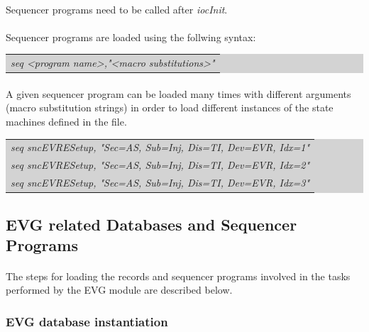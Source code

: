 \documentclass[openany]{article}
\begin{document}
		\paragraph{} {\color{red}Sequencer programs need to be called after \emph{iocInit}.}

		\paragraph{} Sequencer programs are loaded using the follwing syntax:

		\bigskip
		\colorbox{lightgray}{
			\begin{tabularx}{0.9\textwidth}{X}
			\emph{seq \textless program name\textgreater,"\textless macro substitutions\textgreater"}
			\end{tabularx}
		}

		\paragraph{} A given sequencer program can be loaded many times with different arguments (macro substitution strings) in order to load different instances of the state machines defined in the file.

		\bigskip
		\colorbox{lightgray}{
			\begin{tabularx}{0.9\textwidth}{X}
			\emph{seq sncEVRESetup, "Sec=AS, Sub=Inj, Dis=TI, Dev=EVR, Idx=1"} \\
			\emph{seq sncEVRESetup, "Sec=AS, Sub=Inj, Dis=TI, Dev=EVR, Idx=2"} \\
			\emph{seq sncEVRESetup, "Sec=AS, Sub=Inj, Dis=TI, Dev=EVR, Idx=3"} \\
			\end{tabularx}
		}

	\subsection{EVG related Databases and Sequencer Programs}

		\paragraph{} The steps for loading the records and sequencer programs involved in the tasks performed by the EVG module are described below.

		\subsubsection{EVG database instantiation}
\end{document}
